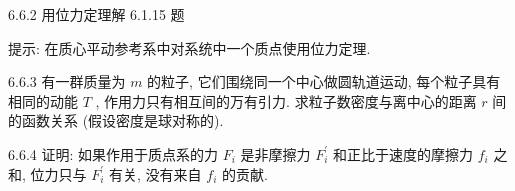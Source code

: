 \begin{problem}{6.6.2}
用位力定理解 6.1.15 题

提示: 在质心平动参考系中对系统中一个质点使用位力定理.
\end{problem}
\clearpage


\begin{problem}{6.6.3}
有一群质量为 $m$ 的粒子, 它们围绕同一个中心做圆轨道运动, 每个粒子具有相同的动能 $T$ , 作用力只有相互间的万有引力. 求粒子数密度与离中心的距离 $r$ 间的函数关系 (假设密度是球对称的).
\end{problem}
\clearpage


\begin{problem}{6.6.4}
证明: 如果作用于质点系的力 $F_{i}$ 是非摩擦力 $F_{i}^{\prime}$ 和正比于速度的摩擦力 $f_{i}$ 之和, 位力只与 $F_{i}^{\prime}$ 有关, 没有来自 $f_{i}$ 的贡献.
\end{problem}
\clearpage

